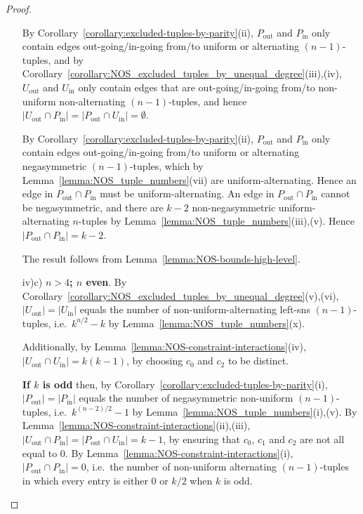 \documentclass[a4paper,11pt]{article}
\theoremstyle{plain}
\theoremstyle{definition}
\theoremstyle{remark}
\begin{document}
\begin{proof}
\begin{itemize}
    By Corollary~\ref{corollary:excluded-tuples-by-parity}(ii), $P_{\text{out}}$ and
    $P_{\text{in}}$ only contain edges out-going/in-going from/to uniform or alternating
    $(n-1)$-tuples, and by
    Corollary~\ref{corollary:NOS_excluded_tuples_by_unequal_degree}(iii),(iv), $U_{\text{out}}$
    and $U_{\text{in}}$ only contain edges that are out-going/in-going from/to non-uniform
    non-alternating $(n-1)$-tuples, and hence $|U_{\text{out}}\cap
    P_{\text{in}}|=|P_{\text{out}}\cap U_{\text{in}}|=\emptyset$.

    By Corollary~\ref{corollary:excluded-tuples-by-parity}(ii), $P_{\text{out}}$ and
    $P_{\text{in}}$ only contain edges out-going/in-going from/to uniform or alternating
    negasymmetric $(n-1)$-tuples, which by Lemma~\ref{lemma:NOS_tuple_numbers}(vii) are
    uniform-alternating. Hence an edge in $P_{\text{out}}\cap P_{\text{in}}$ must be
    uniform-alternating.  An edge in $P_{\text{out}}\cap P_{\text{in}}$ cannot be
    negasymmetric, and there are $k-2$ non-negasymmetric uniform-alternating $n$-tuples by
    Lemma~\ref{lemma:NOS_tuple_numbers}(iii),(v).  Hence$|P_{\text{out}}\cap
    P_{\text{in}}|=k-2$.

    The result follows from Lemma~\ref{lemma:NOS-bounds-high-level}.

\item[iv)c)] {\bf $n>4$; $n$ even}. By
    Corollary~\ref{corollary:NOS_excluded_tuples_by_unequal_degree}(v),(vi),
    $|U_{\text{out}}|=|U_{\text{in}}|$ equals the number of non-uniform-alternating left-sns
    $(n-1)$-tuples, i.e.\ $k^{n/2}-k$ by Lemma~\ref{lemma:NOS_tuple_numbers}(x).

    Additionally, by Lemma~\ref{lemma:NOS-constraint-interactions}(iv), $|U_{\text{out}}\cap
    U_{\text{in}}|=k(k-1)$, by choosing $c_0$ and $c_2$ to be distinct.

    {\bf If $k$ is odd} then, by Corollary~\ref{corollary:excluded-tuples-by-parity}(i),
    $|P_{\text{out}}|=|P_{\text{in}}|$ equals the number of negasymmetric non-uniform
    $(n-1)$-tuples, i.e.\ $k^{(n-2)/2}-1$ by Lemma~\ref{lemma:NOS_tuple_numbers}(i),(v).
     \newline By Lemma~\ref{lemma:NOS-constraint-interactions}(ii),(iii), $|U_{\text{out}}\cap
    P_{\text{in}}|=|P_{\text{out}}\cap U_{\text{in}}|=k-1$, by ensuring that $c_0$,
    $c_1$ and $c_2$ are not all equal to $0$.
     \newline By Lemma~\ref{lemma:NOS-constraint-interactions}(i), $|P_{\text{out}}\cap
    P_{\text{in}}|=0$, i.e.\ the number of non-uniform alternating $(n-1)$-tuples in which
    every entry is either 0 or $k/2$ when $k$ is odd.


\end{itemize}
\end{proof}
\end{document}
